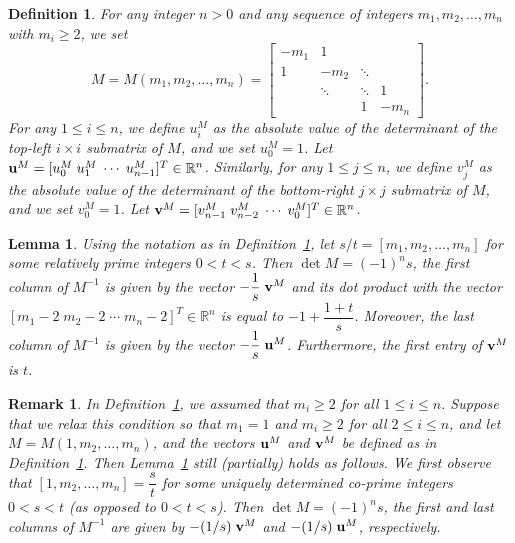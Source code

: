 \documentclass[10pt,a4paper]{amsart}
\newtheorem{definition}{Definition}
\newtheorem{lemma}{Lemma}
\newtheorem{remark}{Remark}
\begin{document}
\begin{definition} \label{def: det} For any integer $n>0$ and any sequence of integers $m_1, m_2, \ldots, m_n$ with $m_i \geq 2$, we set $$M=M(m_1, m_2, \ldots, m_n)= \left[\begin{array}{cccc}
 -m_1 & 1 & &   \\
1 & -m_2 & \ddots & \\
 & \ddots & \ddots & 1 \\
 & & 1 & -m_n 
\end{array}\right].$$  For any $1 \leq i \leq n$, we define $u^M_i$ as the absolute value of the determinant of the top-left $i \times i$ submatrix of $M$, and we set  $u^M_0=1$.  Let ${\bf u}^M=[u^M_0 \; u^M_1 \; \cdots \; u^M_{n-1}]^T \in \mathbb{R}^n$. Similarly, for any $1 \leq j \leq n$, we define $v^M_j$ as the absolute value of the determinant of the bottom-right $j \times j$ submatrix of $M$, and we set $v^M_0=1$. Let ${\bf v}^M=[v^M_{n-1} \; v^M_{n-2} \; \cdots \; v^M_0]^T \in \mathbb{R}^n$. 
\end{definition}

\begin{lemma} \label{lem: firstrow} 
Using the notation as in Definition~\ref{def: det}, let ${s}/{t}=[m_1, m_2, \ldots, m_n]$ for some relatively prime integers $0 < t < s$. Then $\det M = (-1)^n s$,   the first column of $M^{-1}$ is given by the vector  $-\dfrac{1}{s}   \; {\bf v}^M$ and its dot product with the vector $[m_1-2 \; m_2-2 \; \cdots \; m_n-2]^T \in  \mathbb{R}^n$ is equal to $-1+ \dfrac{1+t}{s}$. Moreover,  the last column of $M^{-1}$ is given by the vector  $-\dfrac{1}{s}   \; {\bf u}^M$. Furthermore, the first entry of  ${\bf v}^M$ is $t$. 
\end{lemma} 

\begin{remark} \label{rem: specialcase} In Definition~\ref{def: det}, we assumed that $m_i \geq 2$ for all $1 \leq i \leq n$. Suppose that we relax this condition so that $m_1=1$ and $m_i \geq 2$ for all $2 \leq i \leq n$, and let $M=M(1, m_2, \ldots, m_n)$, and the vectors ${\bf u}^M$ and ${\bf v}^M$ be defined as in Definition~\ref{def: det}. Then  Lemma~\ref{lem: firstrow} still (partially) holds as follows. We first observe that  $[1, m_2, \ldots, m_n]=\dfrac{s}{t}$ for some uniquely determined co-prime integers $0 < s < t $ (as opposed to $0 < t < s$). Then   $\det M = (-1)^n s$, the first and last columns of $M^{-1}$ are given by   $-(1/s)   \; {\bf v}^M$ and   $-(1/s)   \; {\bf u}^M$, respectively.  
\end{remark}
\end{document}
